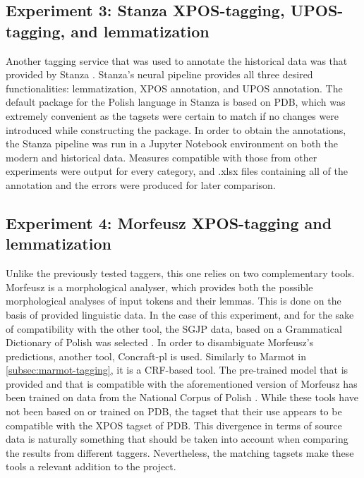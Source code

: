 \subsection{Experiment 3: Stanza XPOS-tagging, UPOS-tagging, and lemmatization}
\label{subsec:stanza-tagging}

Another tagging service that was used to annotate the historical data was that provided by Stanza \citep{manning-etal-2014-stanford, qi2020stanza}. Stanza's neural pipeline provides all three desired functionalities: lemmatization, XPOS annotation, and UPOS annotation. The default package for the Polish language in Stanza is based on PDB, which was extremely convenient as the tagsets were certain to match if no changes were introduced while constructing the package. In order to obtain the annotations, the Stanza pipeline was run in a Jupyter Notebook environment on both the modern and historical data. Measures compatible with those from other experiments were output for every category, and .xlsx files containing all of the annotation and the errors were produced for later comparison.

\subsection{Experiment 4: Morfeusz XPOS-tagging and lemmatization}
\label{subsec:morfeusz-tagging}

Unlike the previously tested taggers, this one relies on two complementary tools. Morfeusz is a morphological analyser, which provides both the possible morphological analyses of input tokens and their lemmas. This is done on the basis of provided linguistic data. In the case of this experiment, and for the sake of compatibility with the other tool, the SGJP data, based on a Grammatical Dictionary of Polish was selected \citep{sal:etal:15, kie:wol:17:morf}. In order to disambiguate Morfeusz's predictions, another tool, Concraft-pl is used. Similarly to Marmot in \autoref{subsec:marmot-tagging}, it is a CRF-based tool. The pre-trained model that is provided and that is compatible with the aforementioned version of Morfeusz has been trained on data from the National Corpus of Polish \citep{nkjp, waszczuk-2012-harnessing, waszczuk2018morphosyntactic}. While these tools have not been based on or trained on PDB, the tagset that their use appears to be compatible with the XPOS tagset of PDB. This divergence in terms of source data is naturally something that should be taken into account when comparing the results from different taggers. Nevertheless, the matching tagsets make these tools a relevant addition to the project.

